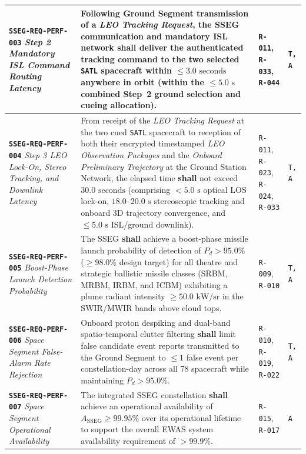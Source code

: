 \documentclass[11pt,a4paper]{article}
\providecommand{\abbr}[1]{#1}
\begin{document}
{\begin{longtable}{|>{\raggedright\arraybackslash}p{}|>{\raggedright\arraybackslash}p{}|>{\raggedright\arraybackslash}p{}|>{\raggedright\arraybackslash}p{}|}
\textbf{\texttt{SSEG-REQ-PERF-003}} \newline \emph{Step 2 Mandatory ISL Command Routing Latency} & Following Ground Segment transmission of a \emph{LEO Tracking Request}, the \abbr{SSEG} communication and mandatory \abbr{ISL} network \textbf{shall} deliver the authenticated tracking command to the two selected \texttt{SATL} spacecraft within $\le 3.0\text{ seconds}$ anywhere in orbit (within the $\le 5.0\text{ s}$ combined Step~2 ground selection and cueing allocation). & \texttt{R-011}, \texttt{R-033}, \texttt{R-044} & \texttt{T, A} \\ \hline
\textbf{\texttt{SSEG-REQ-PERF-004}} \newline \emph{Step 3 LEO Lock-On, Stereo Tracking, and Downlink Latency} & From receipt of the \emph{LEO Tracking Request} at the two cued \texttt{SATL} spacecraft to reception of both their encrypted timestamped \emph{LEO Observation Packages} and the \emph{Onboard Preliminary Trajectory} at the Ground Station Network, the elapsed time \textbf{shall} not exceed $30.0\text{ seconds}$ (comprising $< 5.0\text{ s}$ optical \abbr{LOS} lock-on, $18.0\text{--}20.0\text{ s}$ stereoscopic tracking and onboard 3D trajectory convergence, and $\le 5.0\text{ s}$ \abbr{ISL}/ground downlink). & \texttt{R-011}, \texttt{R-023}, \texttt{R-024}, \texttt{R-033} & \texttt{T, A} \\ \hline
\textbf{\texttt{SSEG-REQ-PERF-005}} \newline \emph{Boost-Phase Launch Detection Probability} & The \abbr{SSEG} \textbf{shall} achieve a boost-phase missile launch probability of detection of $P_d > 95.0\%$ ($\ge 98.0\%$ design target) for all theatre and strategic ballistic missile classes (\abbr{SRBM}, \abbr{MRBM}, \abbr{IRBM}, and \abbr{ICBM}) exhibiting a plume radiant intensity $\ge 50.0\text{ kW/sr}$ in the \abbr{SWIR}/\abbr{MWIR} bands above cloud tops. & \texttt{R-009}, \newline \texttt{R-010} & \texttt{T, A} \\ \hline
\textbf{\texttt{SSEG-REQ-PERF-006}} \newline \emph{Space Segment False-Alarm Rate Rejection} & Onboard proton despiking and dual-band spatio-temporal clutter filtering \textbf{shall} limit false candidate event reports transmitted to the Ground Segment to $\le 1$ false event per constellation-day across all 78 spacecraft while maintaining $P_d > 95.0\%$. & \texttt{R-010}, \texttt{R-019}, \texttt{R-022} & \texttt{T, A} \\ \hline
\textbf{\texttt{SSEG-REQ-PERF-007}} \newline \emph{Space Segment Operational Availability} & The integrated \abbr{SSEG} constellation \textbf{shall} achieve an operational availability of $A_{\text{SSEG}} \ge 99.95\%$ over its operational lifetime to support the overall \abbr{EWAS} system availability requirement of $> 99.9\%$. & \texttt{R-015}, \newline \texttt{R-017} & \texttt{A} \\ \hline

\end{longtable}}
\end{document}
